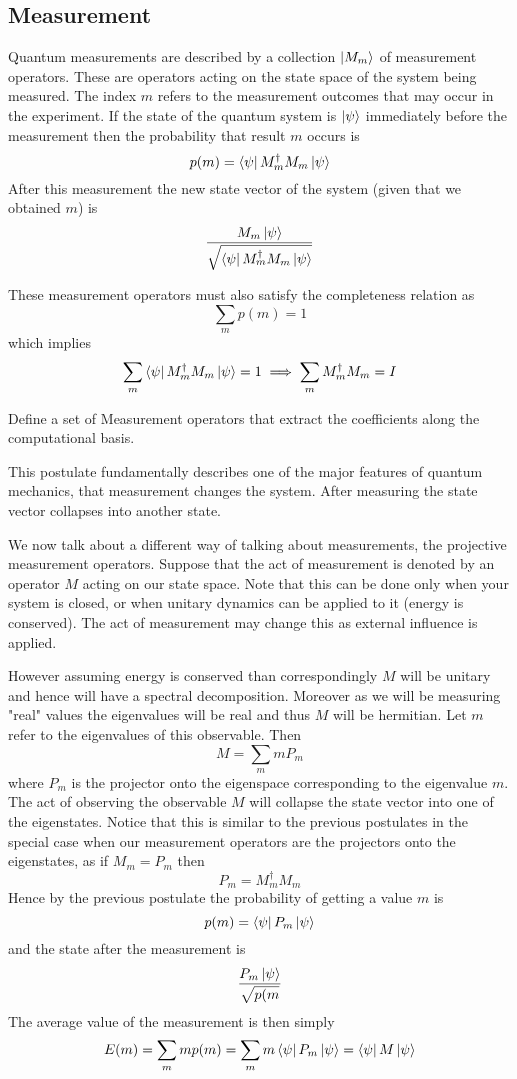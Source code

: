 \subsection{Measurement}
\begin{postulate}
Quantum measurements are described by a collection $\ket{M_m}$ of measurement operators. These are operators acting on the state space of the system being measured. The index $m$ refers to the measurement outcomes that may occur in the experiment. If the state of the quantum system is $\ket{\psi}$ immediately before the measurement then the probability that result $m$ occurs is
$$ p(m) = \bra{\psi}M_m^{\dagger}M_m\ket{\psi} $$
After this measurement the new state vector of the system (given that we obtained $m$) is 
$$ \frac{M_m\ket{\psi}}{\sqrt{\bra{\psi}M_m^{\dagger}M_m\ket{\psi}}} $$
\end{postulate}

These measurement operators must also satisfy the completeness relation as 
$$ \sum_m p(m) = 1$$ which implies $$ \sum_m \bra{\psi}M_m^{\dagger}M_m\ket{\psi} = 1 \implies \sum_m M_m^{\dagger}M_m = I$$

\begin{exercise}
Define a set of Measurement operators that extract the coefficients along the computational basis.
\end{exercise}

This postulate fundamentally describes one of the major features of quantum mechanics, that measurement changes the system. After measuring the state vector collapses into another state.

We now talk about a different way of talking about measurements, the projective measurement operators. Suppose that the act of measurement is denoted by an operator $M$ acting on our state space. Note that this can be done only when your system is closed, or when unitary dynamics can be applied to it (energy is conserved). The act of measurement may change this as external influence is applied.

However assuming energy is conserved than correspondingly $M$ will be unitary and hence will have a spectral decomposition. Moreover as we will be measuring "real" values the eigenvalues will be real and thus $M$ will be hermitian.
Let $m$ refer to the eigenvalues of this observable. Then 
$$ M = \sum_m mP_m $$ 
where $P_m$ is the projector onto the eigenspace corresponding to the eigenvalue $m$. The act of observing the observable $M$ will collapse the state vector into one of the eigenstates. Notice that this is similar to the previous postulates in the special case when our measurement operators are the projectors onto the eigenstates, as if $M_m = P_m$ then $$P_m = M_m^{\dagger}M_m$$
Hence by the previous postulate the probability of getting a value $m$ is 
$$p(m) = \bra{\psi}P_m\ket{\psi}$$ and the state after the measurement is $$\frac{P_{m}\ket{\psi}}{\sqrt{p(m}}$$ The average value of the measurement is then simply $$E(m) = \sum_m mp(m) \\ = \sum_m m\bra{\psi}P_m\ket{\psi} = \bra{\psi}M\ket{\psi}$$

